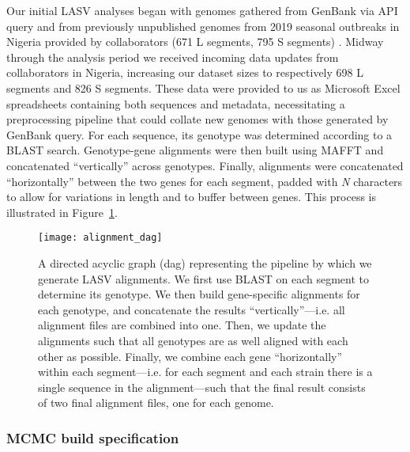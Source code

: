 Our initial LASV analyses began with genomes gathered from GenBank via API query and from previously unpublished genomes from 2019 seasonal outbreaks in Nigeria provided by collaborators (671 L segments, 795 S segments) \cite{kafetzopoulou2019metagenomic}.
Midway through the analysis period we received incoming data updates from collaborators in Nigeria, increasing our dataset sizes to respectively 698 L segments and 826 S segments.
These data were provided to us as Microsoft Excel spreadsheets containing both sequences and metadata, necessitating a preprocessing pipeline that could collate new genomes with those generated by GenBank query.
For each sequence, its genotype was determined according to a BLAST \cite{boratyn2013blast} search.
Genotype-gene alignments were then built using MAFFT and concatenated ``vertically'' across genotypes.
Finally, alignments were concatenated ``horizontally'' between the two genes for each segment, padded with \textit{N} characters to allow for variations in length and to buffer between genes.
This process is illustrated in Figure~\ref{fig:alignment_dag}.

\begin{figure}[ht]
  \centering
  \medskip
  \texttt{[image: alignment\_dag]}
  \caption[LASV alignment pipeline]{A directed acyclic graph (\gls{dag}) representing the pipeline by which we generate LASV alignments. We first use BLAST on each segment to determine its genotype. We then build gene-specific alignments for each genotype, and concatenate the results ``vertically''---i.e. all alignment files are combined into one. Then, we update the alignments such that all genotypes are as well aligned with each other as possible. Finally, we combine each gene ``horizontally'' within each segment---i.e. for each segment and each strain there is a single sequence in the alignment---such that the final result consists of two final alignment files, one for each genome.}
  \label{fig:alignment_dag}
\end{figure}

\subsubsection{MCMC build specification}

